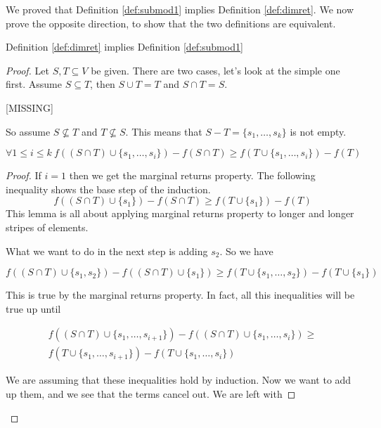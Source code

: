 We proved that Definition \ref{def:submod1} implies Definition \ref{def:dimret}. We now prove the opposite direction, to show that the two definitions are equivalent.

\begin{claim}\label{marg_ret_impl_sm}
	Definition \ref{def:dimret} implies Definition \ref{def:submod1}
\end{claim}
\begin{proof}
Let $S, T \subseteq V$ be given. There are two cases, let's look at the simple one first. Assume $S \subseteq T$, then $S \cup T = T$ and $S\cap T = S$.

[MISSING]

So assume $S \not\subseteq T$ and $T \not\subseteq S$. This means that $S - T =\{s_1,\ldots, s_k\}$ is not empty.
\begin{lem}
\begin{equation}
\forall 1 \leq i \leq k\ f((S \cap T) \cup \{s_1,\ldots, s_i\}) - f(S\cap T) \geq f(T \cup \{s_1,\ldots, s_i\}) - f(T)
\end{equation}
\end{lem}
\begin{proof}
If $i=1$ then we get the marginal returns property. The following inequality shows the base step of the induction.
\begin{equation}
f((S \cap T) \cup \{s_1\}) - f(S\cap T) \geq f(T \cup \{s_1\}) -f(T)
\end{equation}
This lemma is all about applying marginal returns property to longer and longer stripes of elements.

What we want to do in the next step is adding $s_2$. So we have

\begin{equation}
f((S \cap T) \cup \{s_1, s_2\}) - f((S\cap T) \cup \{s_1\} ) \geq f(T \cup \{s_1,\ldots, s_2\}) -f(T \cup \{s_1\})
\end{equation}

This is true by the marginal returns property. In fact, all this inequalities will be true up until

\begin{multline}
f((S \cap T) \cup \{s_1, \ldots, s_{i+1}\}) - f((S\cap T) \cup\{s_1, \ldots, s_i\} ) \geq \\ f(T \cup \{s_1, \ldots, s_{i+1}\}) -f(T \cup \{s_1,\ldots, s_i\})
\end{multline}

We are assuming that these inequalities hold by induction. Now we want to add up them, and we see that the terms cancel out. We are left with


\end{proof}
\end{proof}
